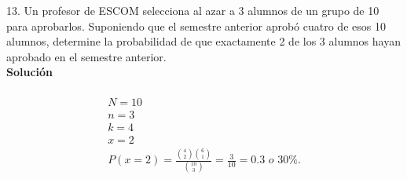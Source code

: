 
\begin{enumerate}
	
\end{enumerate}

13. Un profesor de ESCOM selecciona al azar a 3 alumnos de un grupo de 10 para aprobarlos. Suponiendo que el semestre anterior aprobó cuatro de esos 10 alumnos, determine la probabilidad de que exactamente 2 de los 3 alumnos hayan aprobado en el semestre anterior.
	\\\textbf{Solución}
	\\ \\
	\begin{gather*}
		N = 10 \\
		n = 3 \\
		k = 4 \\
		x = 2 \\
		P(x = 2) = \frac{ \binom{4}{2} \binom{6}{1}}{\binom{10}{3}} = \frac{3}{10} = 0.3 \textit{ o 30\%.}
	\end{gather*}




